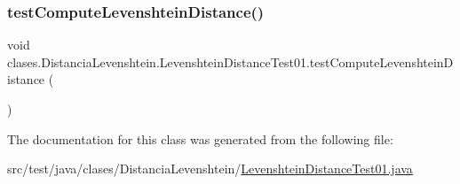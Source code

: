 \subsubsection{\texorpdfstring{test\+Compute\+Levenshtein\+Distance()}{testComputeLevenshteinDistance()}}
{\footnotesize\ttfamily void clases.\+Distancia\+Levenshtein.\+Levenshtein\+Distance\+Test01.\+test\+Compute\+Levenshtein\+Distance (\begin{DoxyParamCaption}{ }\end{DoxyParamCaption})}



The documentation for this class was generated from the following file\+:\begin{DoxyCompactItemize}
\item 
src/test/java/clases/\+Distancia\+Levenshtein/\hyperlink{_levenshtein_distance_test01_8java}{Levenshtein\+Distance\+Test01.\+java}\end{DoxyCompactItemize}
